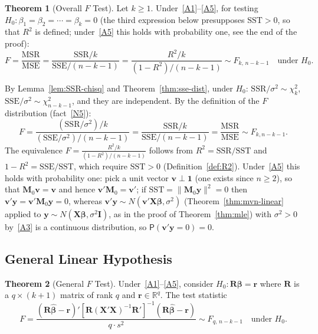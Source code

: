 \documentclass[12pt,a4paper]{article}
\makeatletter
\theoremstyle{definition}
\newtheorem{theorem}{Theorem}[section]
\renewenvironment{proof}[1][\proofname]{\par
  \pushQED{\qed}%
  \normalfont \topsep6\p@\@plus6\p@\relax
  \trivlist
  \item[\hskip\labelsep\bfseries #1\@addpunct{.}]\ignorespaces
}{%
  \popQED\endtrivlist\@endpefalse
}
\newcommand\prb{\mathsf{P}}
\newcommand{\SST}{\mathrm{SST}}
\newcommand{\SSR}{\mathrm{SSR}}
\newcommand{\SSE}{\mathrm{SSE}}
\newcommand{\MSR}{\mathrm{MSR}}
\newcommand{\MSE}{\mathrm{MSE}}
\newcommand{\bX}{\mathbf{X}}
\newcommand{\by}{\mathbf{y}}
\def\bb{\boldsymbol{\beta}}
\newcommand{\bI}{\mathbf{I}}
\newcommand{\bM}{\mathbf{M}}
\newcommand{\bR}{\mathbf{R}}
\newcommand{\br}{\mathbf{r}}
\newcommand{\bone}{\mathbf{1}}
\newcommand{\bv}{\mathbf{v}}
\newcommand{\Real}{\mathbb{R}}
\makeatother
\begin{document}
\begin{theorem}[Overall $F$ Test]\label{thm:f-test}
Let $k \geqslant 1$. Under~\ref{A1}--\ref{A5}, for testing $H_0\colon \beta_1 = \beta_2 = \cdots = \beta_k = 0$ (the third expression below presupposes $\SST > 0$, so that $R^2$ is defined; under~\ref{A5} this holds with probability one, see the end of the proof):
\begin{equation}\label{eq:f-test}
\boxed{F = \frac{\MSR}{\MSE} = \frac{\SSR/k}{\SSE/(n-k-1)} = \frac{R^2/k}{(1-R^2)/(n-k-1)} \sim F_{k,\,n-k-1} \quad \text{under } H_0.}
\end{equation}
\end{theorem}

\begin{proof}
By Lemma~\ref{lem:SSR-chisq} and Theorem~\ref{thm:sse-dist}, under $H_0$: $\SSR/\sigma^2 \sim \chi^2_k$, $\SSE/\sigma^2 \sim \chi^2_{n-k-1}$, and they are independent. By the definition of the $F$ distribution (fact~\ref{N5}):
\[
F = \frac{(\SSR/\sigma^2)/k}{(\SSE/\sigma^2)/(n-k-1)} = \frac{\SSR/k}{\SSE/(n-k-1)} = \frac{\MSR}{\MSE} \sim F_{k, n-k-1}.
\]
The equivalence $F = \frac{R^2/k}{(1-R^2)/(n-k-1)}$ follows from $R^2 = \SSR/\SST$ and $1 - R^2 = \SSE/\SST$, which require $\SST > 0$ (Definition~\ref{def:R2}). Under~\ref{A5} this holds with probability one: pick a unit vector $\bv \perp \bone$ (one exists since $n \geqslant 2$), so that $\bM_0\bv = \bv$ and hence $\bv'\bM_0 = \bv'$; if $\SST = \|\bM_0\by\|^2 = 0$ then $\bv'\by = \bv'\bM_0\by = 0$, whereas $\bv'\by \sim N(\bv'\bX\bb, \sigma^2)$ (Theorem~\ref{thm:mvn-linear} applied to $\by \sim N(\bX\bb, \sigma^2\bI)$, as in the proof of Theorem~\ref{thm:mle}) with $\sigma^2 > 0$ by~\ref{A3} is a continuous distribution, so $\prb(\bv'\by = 0) = 0$.
\end{proof}

\subsection{General Linear Hypothesis}

\begin{theorem}[General $F$ Test]\label{thm:general-F}
Under~\ref{A1}--\ref{A5}, consider $H_0\colon \bR\bb = \br$ where $\bR$ is a $q \times (k+1)$ matrix of rank $q$ and $\br \in \Real^q$. The test statistic
\begin{equation}\label{eq:general-F}
\boxed{F = \frac{(\bR\hat{\bb} - \br)'[\bR(\bX'\bX)^{-1}\bR']^{-1}(\bR\hat{\bb} - \br)}{q \cdot s^2} \sim F_{q,\, n-k-1} \quad \text{under } H_0.}
\end{equation}
\end{theorem}
\end{document}
